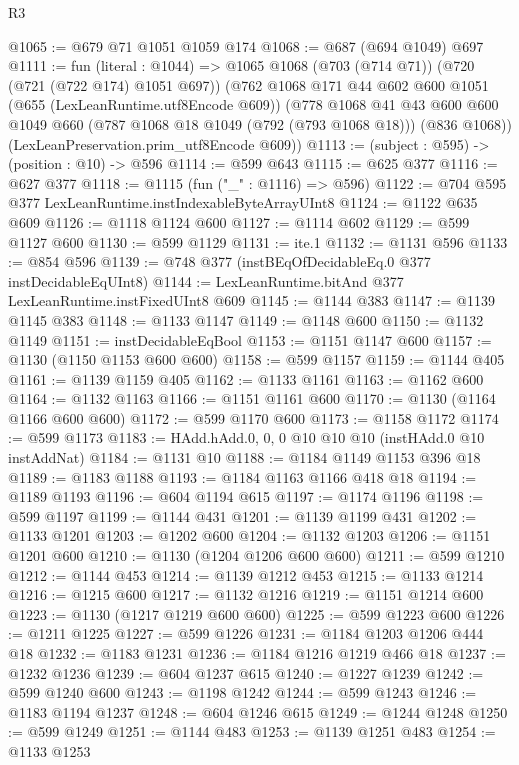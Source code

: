 \begin{lexlean}{R3}
\begin{coremodule}
@1065 := @679 @71 @1051 @1059 @174
@1068 := @687 (@694 @1049) @697
@1111 := fun (literal : @1044) =>
  @1065
    @1068
    (@703 (@714 @71))
    (@720 (@721 (@722 @174) @1051 @697))
    (@762
      @1068
      @171
      @44
      @602
      @600
      @1051
      (@655 (LexLeanRuntime.utf8Encode @609))
      (@778
        @1068
        @41
        @43
        @600
        @600
        @1049
        @660
        (@787 @1068 @18 @1049 (@792 (@793 @1068 @18)))
        (@836 @1068))
      (LexLeanPreservation.prim_utf8Encode @609))
@1113 := (subject : @595) -> (position : @10) -> @596
@1114 := @599 @643
@1115 := @625 @377
@1116 := @627 @377
@1118 := @1115 (fun ("_" : @1116) => @596)
@1122 := @704 @595 @377 LexLeanRuntime.instIndexableByteArrayUInt8
@1124 := @1122 @635 @609
@1126 := @1118 @1124 @600
@1127 := @1114 @602
@1129 := @599 @1127 @600
@1130 := @599 @1129
@1131 := ite.{1}
@1132 := @1131 @596
@1133 := @854 @596
@1139 := @748 @377 (instBEqOfDecidableEq.{0} @377 instDecidableEqUInt8)
@1144 := LexLeanRuntime.bitAnd @377 LexLeanRuntime.instFixedUInt8 @609
@1145 := @1144 @383
@1147 := @1139 @1145 @383
@1148 := @1133 @1147
@1149 := @1148 @600
@1150 := @1132 @1149
@1151 := instDecidableEqBool
@1153 := @1151 @1147 @600
@1157 := @1130 (@1150 @1153 @600 @600)
@1158 := @599 @1157
@1159 := @1144 @405
@1161 := @1139 @1159 @405
@1162 := @1133 @1161
@1163 := @1162 @600
@1164 := @1132 @1163
@1166 := @1151 @1161 @600
@1170 := @1130 (@1164 @1166 @600 @600)
@1172 := @599 @1170 @600
@1173 := @1158 @1172
@1174 := @599 @1173
@1183 := HAdd.hAdd.{0, 0, 0} @10 @10 @10 (instHAdd.{0} @10 instAddNat)
@1184 := @1131 @10
@1188 := @1184 @1149 @1153 @396 @18
@1189 := @1183 @1188
@1193 := @1184 @1163 @1166 @418 @18
@1194 := @1189 @1193
@1196 := @604 @1194 @615
@1197 := @1174 @1196
@1198 := @599 @1197
@1199 := @1144 @431
@1201 := @1139 @1199 @431
@1202 := @1133 @1201
@1203 := @1202 @600
@1204 := @1132 @1203
@1206 := @1151 @1201 @600
@1210 := @1130 (@1204 @1206 @600 @600)
@1211 := @599 @1210
@1212 := @1144 @453
@1214 := @1139 @1212 @453
@1215 := @1133 @1214
@1216 := @1215 @600
@1217 := @1132 @1216
@1219 := @1151 @1214 @600
@1223 := @1130 (@1217 @1219 @600 @600)
@1225 := @599 @1223 @600
@1226 := @1211 @1225
@1227 := @599 @1226
@1231 := @1184 @1203 @1206 @444 @18
@1232 := @1183 @1231
@1236 := @1184 @1216 @1219 @466 @18
@1237 := @1232 @1236
@1239 := @604 @1237 @615
@1240 := @1227 @1239
@1242 := @599 @1240 @600
@1243 := @1198 @1242
@1244 := @599 @1243
@1246 := @1183 @1194 @1237
@1248 := @604 @1246 @615
@1249 := @1244 @1248
@1250 := @599 @1249
@1251 := @1144 @483
@1253 := @1139 @1251 @483
@1254 := @1133 @1253

\end{coremodule}
\end{lexlean}
